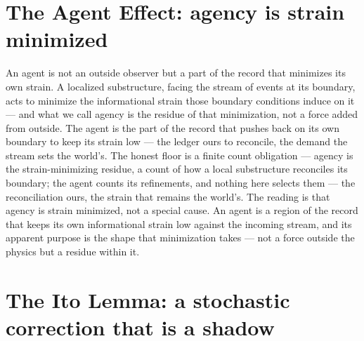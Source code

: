 \section{The Agent Effect: agency is strain minimized}
\label{se:agent}

An agent is not an outside observer but a part of the record that minimizes its own strain. A localized
substructure, facing the stream of events at its boundary, acts to minimize the informational strain those
boundary conditions induce on it --- and what we call agency is the residue of that minimization, not a force
added from outside. The agent is the part of the record that pushes back on its own boundary to keep its
strain low --- the ledger ours to reconcile, the demand the stream sets the world's. The honest floor is a
finite count obligation --- agency is the strain-minimizing residue, a count
of how a local substructure reconciles its boundary; the agent counts its refinements, and nothing here
selects them --- the reconciliation ours, the strain that remains the world's. The reading is that agency is
strain minimized, not a
special cause. An agent is a region of the record that keeps its own informational strain low against the
incoming stream, and its apparent purpose is the shape that minimization takes --- not a force outside the
physics but a residue within it.

\section{The Ito Lemma: a stochastic correction that is a shadow}
\label{se:ito}

